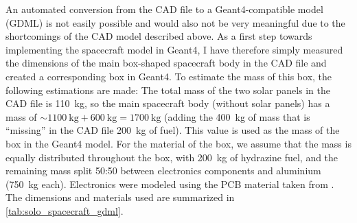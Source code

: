 An automated conversion from the CAD file to a Geant4-compatible model (GDML) is not easily possible and would also not be very meaningful due to the shortcomings of the CAD model described above.
As a first step towards implementing the spacecraft model in Geant4, I have therefore simply measured the dimensions of the main box-shaped spacecraft body in the CAD file and created a corresponding box in Geant4. To estimate the mass of this box, the following estimations are made: 
The total mass of the two solar panels in the CAD file is \SI{110}{\kilo\gram}, so the main spacecraft body (without solar panels) has a mass of $\sim\SI{1100}{\kilogram} + \SI{600}{\kilogram} = \SI{1700}{\kilogram}$ (adding the \SI{400}{\kilogram} of mass that is ``missing'' in the CAD file \SI{200}{\kilogram} of fuel). This value is used as the mass of the box in the Geant4 model.
For the material of the box, we assume that the mass is equally distributed throughout the box, with \SI{200}{\kilogram} of hydrazine fuel, and the remaining mass split 50:50 between electronics components and aluminium (\SI{750}{\kilogram} each). Electronics were modeled using the PCB material taken from \citet{Appel-2018,Appel-2018-PhD}.
The dimensions and materials used are summarized in \autoref{tab:solo_spacecraft_gdml}.

